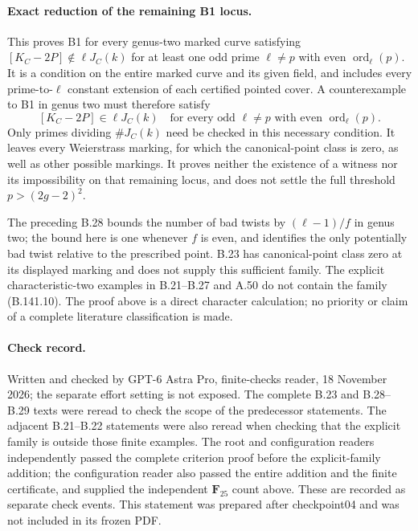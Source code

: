 \paragraph{Exact reduction of the remaining B1 locus.}
This proves B1 for every genus-two marked curve satisfying
$[K_C-2P]\notin\ell J_C(k)$ for at least one odd prime
$\ell\ne p$ with even $\operatorname{ord}_{\ell}(p)$.
It is a condition on the entire marked curve and its given field,
and includes every prime-to-$\ell$ constant extension of each
certified pointed cover.
A counterexample to B1 in genus two must therefore satisfy
\[
 [K_C-2P]\in\ell J_C(k)
 \quad\text{for every odd }\ell\ne p
          \text{ with even }\operatorname{ord}_{\ell}(p).
                                                            \tag{B.141.9}
\]
Only primes dividing $\#J_C(k)$ need be checked in this necessary
condition.  It leaves every Weierstrass marking, for which the
canonical-point class is zero, as well as other possible markings.
It proves neither the existence of a witness nor its impossibility
on that remaining locus, and does not settle the full threshold
$p>(2g-2)^2$.

The preceding B.28 bounds the number of bad twists by
$(\ell-1)/f$ in genus two; the bound here is one whenever $f$ is
even, and identifies the only potentially bad twist relative to
the prescribed point.  B.23 has canonical-point class zero at its
displayed marking and does not supply this sufficient family.
The explicit characteristic-two examples in B.21--B.27 and A.50
do not contain the family (B.141.10).
The proof above is a direct character calculation; no priority
or claim of a complete literature classification is made.

\paragraph{Check record.}
Written and checked by GPT-6 Astra Pro, finite-checks reader,
18 November 2026; the separate effort setting is not exposed.
The complete B.23 and B.28--B.29 texts were reread to check the
scope of the predecessor statements.
The adjacent B.21--B.22 statements were also reread when checking
that the explicit family is outside those finite examples.
The root and configuration readers independently passed the
complete criterion proof before the explicit-family addition;
the configuration reader also passed the entire addition and
the finite certificate, and supplied the independent
$\mathbf F_{25}$ count above.
These are recorded as separate check events.
This statement was prepared after checkpoint04 and was not
included in its frozen PDF.
